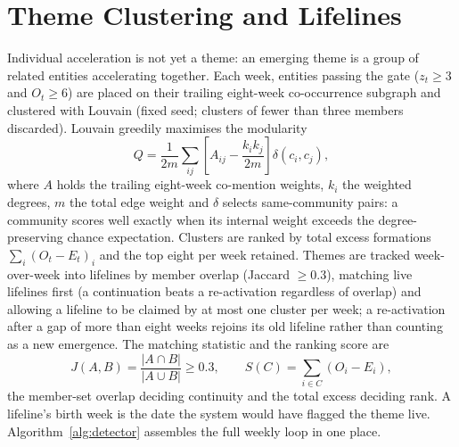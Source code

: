 \documentclass[a4paper,12pt]{report}
\begin{document}
\section{Theme Clustering and Lifelines}
Individual acceleration is not yet a theme: an emerging theme is a group of
related entities accelerating together. Each week, entities passing the gate
($z_t \geq 3$ and $O_t \geq 6$) are placed on their trailing eight-week
co-occurrence subgraph and clustered with Louvain
\citep{Blondel2008Louvain} (fixed seed; clusters of fewer than three members
discarded). Louvain greedily maximises the modularity
\begin{equation}
Q = \frac{1}{2m} \sum_{ij} \left[ A_{ij} - \frac{k_i k_j}{2m} \right]
\delta(c_i, c_j),
\label{eq:modularity}
\end{equation}
where $A$ holds the trailing eight-week co-mention weights, $k_i$ the
weighted degrees, $m$ the total edge weight and $\delta$ selects
same-community pairs: a community scores well exactly when its internal
weight exceeds the degree-preserving chance expectation. Clusters are ranked by total excess formations
$\sum_i (O_t - E_t)_i$ and the top eight per week retained. Themes are
tracked week-over-week into lifelines by member overlap (Jaccard
$\geq 0.3$), matching live lifelines first (a continuation beats a
re-activation regardless of overlap) and allowing a lifeline to be claimed
by at most one cluster per week; a re-activation after a gap of more than
eight weeks rejoins its old lifeline rather than counting as a new emergence.
The matching statistic and the ranking score are
\begin{equation}
J(A, B) = \frac{|A \cap B|}{|A \cup B|} \geq 0.3, \qquad
S(C) = \sum_{i \in C} (O_i - E_i),
\label{eq:lifeline}
\end{equation}
the member-set overlap deciding continuity and the total excess deciding
rank. A lifeline's birth week is the date the system would have flagged the
theme live. Algorithm~\ref{alg:detector} assembles the full weekly loop
in one place.
\end{document}
